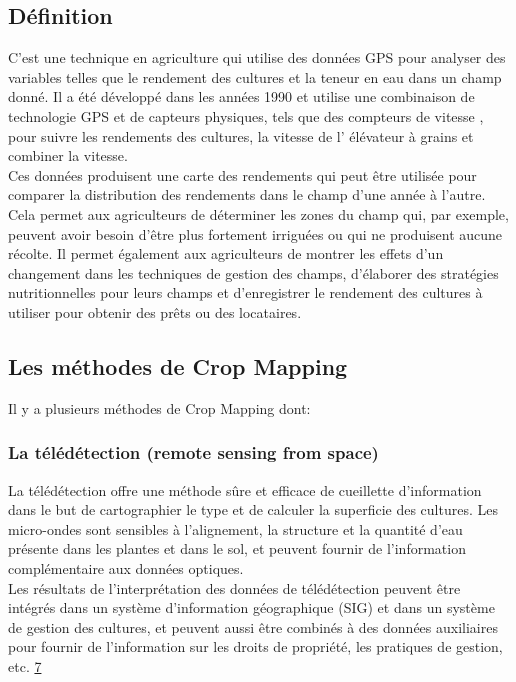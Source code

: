 \documentclass[12pt, openany]{report}
\begin{document}
\subsection{Définition}
C’est une technique en agriculture qui utilise des données GPS pour analyser des variables telles que le rendement des cultures et la teneur en eau dans un champ donné. Il a été développé dans les années 1990 et utilise une combinaison de technologie GPS et de capteurs physiques, tels que des compteurs de vitesse , pour suivre les rendements des cultures, la vitesse de l' élévateur à grains et combiner la vitesse.\\
Ces données produisent une carte des rendements qui peut être utilisée pour comparer la distribution des rendements dans le champ d'une année à l'autre. Cela permet aux agriculteurs de déterminer les zones du champ qui, par exemple, peuvent avoir besoin d'être plus fortement irriguées ou qui ne produisent aucune récolte. Il permet également aux agriculteurs de montrer les effets d'un changement dans les techniques de gestion des champs, d'élaborer des stratégies nutritionnelles pour leurs champs et d'enregistrer le rendement des cultures à utiliser pour obtenir des prêts ou des locataires.

\subsection{Les méthodes de Crop Mapping}
Il y a plusieurs méthodes de Crop Mapping dont:

\subsubsection{La télédétection (remote sensing from space)}
La télédétection offre une méthode sûre et efficace de cueillette d'information dans le but de cartographier le type et de calculer la superficie des cultures.
Les micro-ondes sont sensibles à l'alignement, la structure et la quantité d'eau présente dans les plantes et dans le sol, et peuvent fournir de l'information complémentaire aux données optiques. \\
Les résultats de l'interprétation des données de télédétection peuvent être intégrés dans un système d'information géographique (SIG) et dans un système de gestion des cultures, et peuvent aussi être combinés à des données auxiliaires pour fournir de l'information sur les droits de propriété, les pratiques de gestion, etc. \hyperref[sec:refs]{7}
\end{document}
